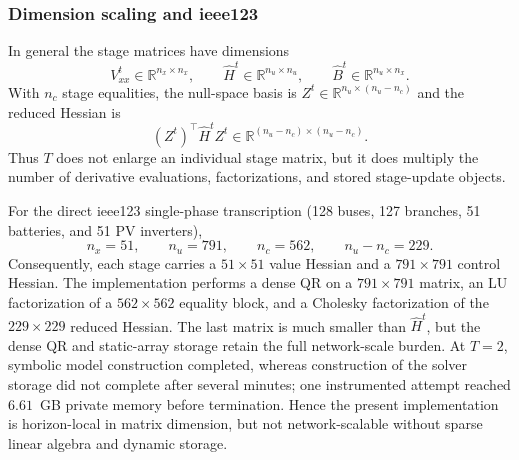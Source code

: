 \subsubsection{Dimension scaling and ieee123}
In general the stage matrices have dimensions
\begin{equation}
V_{xx}^t\in\mathbb{R}^{n_x\times n_x},\qquad
\hat H^t\in\mathbb{R}^{n_u\times n_u},\qquad
\hat B^t\in\mathbb{R}^{n_u\times n_x}.
\label{eq:kkt_sizes}
\end{equation}
With $n_c$ stage equalities, the null-space basis is
$Z^t\in\mathbb{R}^{n_u\times(n_u-n_c)}$ and the reduced Hessian is
\begin{equation}
(Z^t)^\top\hat H^t Z^t
\in\mathbb{R}^{(n_u-n_c)\times(n_u-n_c)}.
\label{eq:kkt_reduced_size}
\end{equation}
Thus $T$ does not enlarge an individual stage matrix, but it does multiply the
number of derivative evaluations, factorizations, and stored stage-update
objects.

For the direct ieee123 single-phase transcription (128 buses, 127 branches,
51 batteries, and 51 PV inverters),
\begin{equation}
n_x=51,\qquad n_u=791,\qquad n_c=562,\qquad n_u-n_c=229.
\label{eq:kkt_ieee123_sizes}
\end{equation}
Consequently, each stage carries a $51\times51$ value Hessian and a
$791\times791$ control Hessian.  The implementation performs a dense QR on a
$791\times791$ matrix, an LU factorization of a $562\times562$ equality block,
and a Cholesky factorization of the $229\times229$ reduced Hessian.  The last
matrix is much smaller than $\hat H^t$, but the dense QR and static-array
storage retain the full network-scale burden.  At $T=2$, symbolic model
construction completed, whereas construction of the solver storage did not
complete after several minutes; one instrumented attempt reached
$6.61$~GB private memory before termination.  Hence the present implementation
is horizon-local in matrix dimension, but not network-scalable without sparse
linear algebra and dynamic storage.

